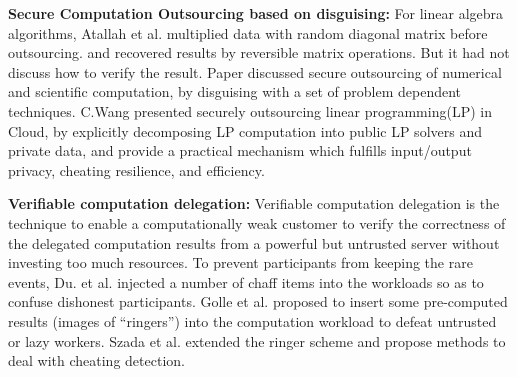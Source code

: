 \documentclass[runningheads,a4paper]{llncs}
\begin{document}
\textbf{Secure Computation Outsourcing based on disguising:}
For linear algebra algorithms, 
Atallah et al. \cite{t19} multiplied data with random diagonal matrix before outsourcing. 
and recovered results by reversible matrix operations. 
But it had not discuss how to verify the result.
Paper \cite{t20} discussed secure outsourcing of numerical and scientific computation,
by disguising with a set of problem dependent techniques.
C.Wang\cite{t5} presented securely outsourcing linear programming(LP) in Cloud,
by explicitly decomposing LP computation into public LP solvers and private data, 
and provide a practical mechanism which fulfills input/output privacy, 
cheating resilience, and efficiency.
% 

\textbf{Verifiable computation delegation:}
Verifiable computation delegation is the technique to enable 
a computationally weak customer to verify the correctness of the delegated computation results
from a powerful but untrusted server without investing too much resources.
To prevent participants from keeping the rare events, 
Du. et al. \cite{t17} injected a number of chaff items into the workloads so as to confuse dishonest participants.
Golle et al. \cite{t32} proposed to insert some pre-computed results (images of “ringers”) 
into the computation workload to defeat untrusted or lazy workers. 
Szada et al. \cite{t33} extended the ringer scheme and propose methods 
to deal with cheating detection.
\end{document}
